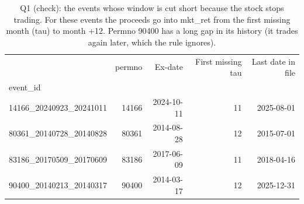 \begin{table}
\caption{Q1 (check): the events whose window is cut short because the stock stops trading. For these events the proceeds go into mkt\_ret from the first missing month (tau) to month +12. Permno 90400 has a long gap in its history (it trades again later, which the rule ignores).}
\label{tab:q1b}
\begin{tabular}{lrrrr}
\toprule
 & permno & Ex-date & First missing tau & Last date in file \\
event\_id &  &  &  &  \\
\midrule
14166\_20240923\_20241011 & 14166 & 2024-10-11 & 11 & 2025-08-01 \\
80361\_20140728\_20140828 & 80361 & 2014-08-28 & 12 & 2015-07-01 \\
83186\_20170509\_20170609 & 83186 & 2017-06-09 & 11 & 2018-04-16 \\
90400\_20140213\_20140317 & 90400 & 2014-03-17 & 12 & 2025-12-31 \\
\bottomrule
\end{tabular}
\end{table}
